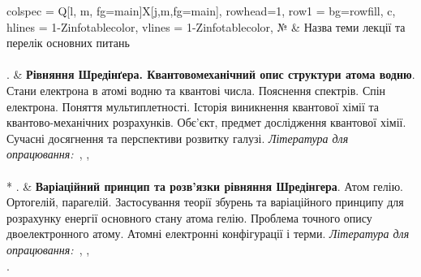 \documentclass{Syllabus}
\def\lit{\textit{Література для опрацювання:\ }}
\begin{document}
\begin{longtblr}[]{
	colspec = {Q[l, m, fg=main]X[j,m,fg=main]},
    rowhead=1,
	row{1} = {bg=rowfill, c},
	hlines = {1-Z}{infotablecolor},
	vlines = {1-Z}{infotablecolor},
	}
	№                                                                           & Назва теми лекції та перелік основних питань                                                                                                                                                                                                                                                                                                                                                                                                                                                                                                                                                   \\
 \\
\rownumber.
& \textbf{Рівняння Шредінґера. Квантовомеханічний опис структури атома водню}. Стани електрона в атомі водню та квантові числа. Пояснення спектрів.  Спін електрона. Поняття мультиплетності. Історія виникнення квантової хімії та квантово-механічних розрахунків. Обє'єкт, предмет дослідження квантової хімії. Сучасні досягнення та перспективи розвитку галузі.
\newline
\lit{}\cite[Розділ 1]{YatsimirsijQChem}, \cite[Глава I, II, IV]{Yatsimirsij}, \cite[Глава 3, \S\  3.1]{Cirelson}
\\
\\*
\rownumber.
& \textbf{Варіаційний принцип та розв'язки рівняння Шредінгера}. Атом гелію. Ортогелій, парагелій. Застосування теорії збурень та варіаційного принципу для розрахунку енергії основного стану атома гелію. Проблема точного опису двоелектронного атому. Атомні електронні конфігурації і терми.
\newline
\lit{}\cite[Розділ 2. \S 2.2]{YatsimirsijQChem}, \cite[Глава V]{Yatsimirsij}, \cite[Глава 2]{Cirelson}
\\
\rownumber.

\end{longtblr}
\end{document}
